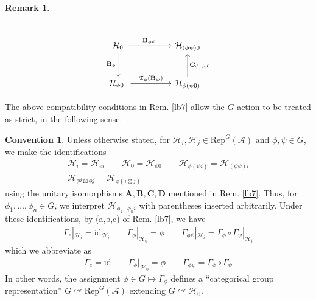 \documentclass[11pt,b5paper,notitlepage]{article}
\theoremstyle{definition}
\newtheorem{rem}[df]{Remark}
\newtheorem{cv}[df]{Convention}
\theoremstyle{plain}
\newcommand{\fk}{\mathfrak}
\newcommand{\id}{\mathrm{id}}
\newcommand{\RepGA}{\mathrm{Rep}^G(\mathcal A)}
\newcommand{\mbf}{\mathbf}
\newcommand{\MH}{\mathcal H}
\numberwithin{equation}{section}
\begin{document}
\begin{rem}
\begin{enumerate}[label=(\alph*)]
\begin{subequations}
\begin{gather}
\begin{tikzcd}[column sep=3cm,row sep=large,ampersand replacement=\&]
\end{tikzcd}\label{eq72a}\\
\begin{tikzcd}[column sep=huge,row sep=large,ampersand replacement=\&]
\MH_0 \arrow[r,"\mbf B_{\phi\psi}"] \arrow[d,"\mbf B_\phi"'] \& \MH_{(\phi\psi)0}  \\
\MH_{\phi 0}\  \arrow[r,"\fk T_\phi(\mbf B_\psi)"]           \& \MH_{\phi(\psi 0)}        \arrow[u,"\mbf C_{\phi,\psi,0}"']
\end{tikzcd}\label{eq72b}
\end{gather}
\end{subequations}
\end{enumerate}
\end{rem}




The above compatibility conditions in Rem. \ref{lb7} allow the $G$-action to be treated as strict, in the following sense.

\begin{cv}\label{lb10}
Unless otherwise stated, for $\MH_i,\MH_j\in\RepGA$ and $\phi,\psi\in G$, we make the identifications
\begin{subequations}\label{eq5}
\begin{gather}
\MH_i=\MH_{ei}\qquad \MH_0=\MH_{\phi 0}\qquad \MH_{\phi(\psi i)}=\MH_{(\phi\psi) i}\label{eq5a}\\
\MH_{\phi i\boxtimes\phi j}=\MH_{\phi(i\boxtimes j)} \label{eq5b}
\end{gather}
\end{subequations}
using the unitary isomorphisms $\mbf A,\mbf B,\mbf C,\mbf D$ mentioned in Rem. \ref{lb7}. Thus, for $\phi_1,\dots,\phi_n\in G$, we interpret $\MH_{\phi_1\cdots\phi_n i}$ with parentheses inserted arbitrarily. Under these identifications, by (a,b,c) of Rem. \ref{lb7}, we have
\begin{align*}
\Gamma_e|_{\MH_i}=\id_{\MH_i}\qquad \Gamma_\phi|_{\MH_0}=\phi\qquad \Gamma_{\phi\psi}|_{\MH_i}=\Gamma_\phi\circ\Gamma_\psi|_{\MH_i}
\end{align*}
which we abbreviate as
\begin{align}\label{eq6}
\Gamma_e=\id\qquad\Gamma_\phi|_{\MH_0}=\phi\qquad  \Gamma_{\phi\psi}=\Gamma_\phi\circ\Gamma_\psi
\end{align}
In other words, the assignment $\phi\in G\mapsto \Gamma_\phi$ defines a ``categorical group representation'' $G\curvearrowright\RepGA$ extending $G\curvearrowright\MH_0$.
\end{cv}
\end{document}

